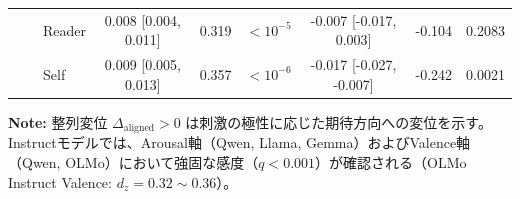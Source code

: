 \begin{table}[htbp]
\begin{tabular}{lll ccc ccc}
                       &                      & Reader     & 0.008 [0.004, 0.011] & 0.319 & $<10^{-5}$ & -0.007 [-0.017, 0.003] & -0.104 & 0.2083 \\
                       &                      & Self       & 0.009 [0.005, 0.013] & 0.357 & $<10^{-6}$ & -0.017 [-0.027, -0.007] & -0.242 & 0.0021 \\
\bottomrule
\end{tabular}
\vspace{1ex}
\begin{minipage}{\linewidth}
\footnotesize
\textbf{Note:} 整列変位 $\Delta_{\text{aligned}} > 0$ は刺激の極性に応じた期待方向への変位を示す。Instructモデルでは、Arousal軸（Qwen, Llama, Gemma）およびValence軸（Qwen, OLMo）において強固な感度（$q < 0.001$）が確認される（OLMo Instruct Valence: $d_z = 0.32 \sim 0.36$）。
\end{minipage}
\end{table}

